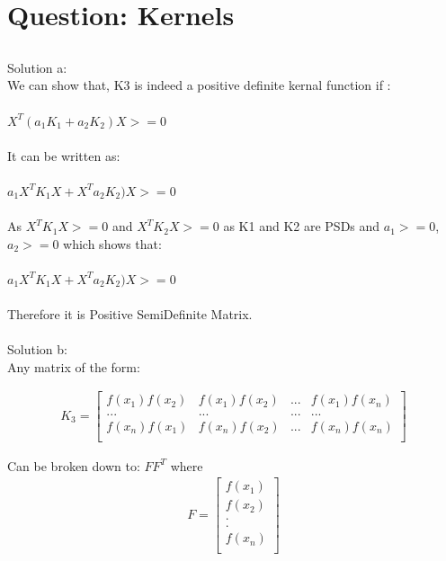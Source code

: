 \documentclass[paper=a4, fontsize=11pt]{scrartcl} %
\numberwithin{equation}{section} %
\numberwithin{figure}{section} %
\numberwithin{table}{section} %
\begin{document}
\section{Question: Kernels}

\subsection{}
Solution a:\\
We can show that, K3 is indeed a positive definite kernal function if :\\\\
$X^{T}(a_{1}K_{1}+a_{2}K_{2})X >= 0$\\\\
It can be written as: \\\\
$a_{1}X^{T}K_{1}X+X^{T}a_{2}K_{2})X >= 0$\\\\

As $X^{T}K_{1}X>=0$ and $X^{T}K_{2}X>=0$ as K1 and K2 are PSDs and $a_{1}>=0$,$a_{2}>=0$ which shows that: \\\\

$a_{1}X^{T}K_{1}X+X^{T}a_{2}K_{2})X >= 0$\\\\

Therefore it is Positive SemiDefinite Matrix.\\\\

Solution b:\\
Any matrix of the form:

\begin{align*}
K_{3} = 
\begin{bmatrix}
f(x_{1})f(x_{2}) & f(x_{1})f(x_{2}) & ... & f(x_{1})f(x_{n})\\
... & ... & ... & ...\\
f(x_{n})f(x_{1}) & f(x_{n})f(x_{2}) & ... & f(x_{n})f(x_{n})\\
\end{bmatrix}
\end{align*}


Can be broken down to: $ FF^{T} $ where
\begin{align*}
F = 
\begin{bmatrix}
f(x_{1})\\
f(x_{2})\\
.\\
.\\
f(x_{n})\\
\end{bmatrix}
\end{align*}
\end{document}
